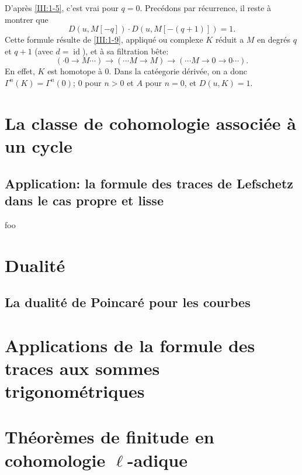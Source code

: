 \documentclass[oneside]{book}
\begin{document}
D'apr\`es \ref{III:1-5}, c'est vrai pour $q=0$. Prec\'edons par r\'ecurrence, il 
reste \`a montrer que 
\[
  D\left(u,M[-q]\right) \cdot D\left(u,M[-(q+1)]\right) = 1 \text{.}
\]
Cette formule r\'esulte de \ref{III:1-9}, appliqu\'e ou complexe $K$ r\'eduit a 
$M$ en degr\'es $q$ et $q+1$ (avec $d=\operatorname{id}$), et \`a sa 
filtration b\^ete:
\[
  (\cdot 0 \to M \cdots) \to (\cdots M \to M) \to (\cdots M \to 0 \to 0 \cdots) \text{.}
\]
En effet, $K$ est homotope \`a $0$. Dans la cat\'eegorie d\'eriv\'ee, on a donc 
$\Gamma^n(K)=\Gamma^n(0)$; $0$ pour $n>0$ et $A$ pour $n=0$, et $D(u,K)=1$. 










\chapter{La classe de cohomologie associée à un cycle}\label{IV}

\section{Application: la formule des traces de Lefschetz dans le cas propre et lisse}\label{IV:3}

\begin{corollary_}\label{IV:3-7}
foo
\end{corollary_}

\chapter{Dualité}\label{V}

\section{La dualité de Poincaré pour les courbes}\label{V:2}

\chapter{Applications de la formule des traces aux sommes trigonométriques}\label{VI}

\chapter{Théorèmes de finitude en cohomologie \texorpdfstring{$\ell$}{l}-adique}\label{VII}
\end{document}
